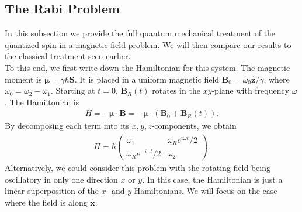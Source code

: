 \documentclass{book}
\theoremstyle{definition}
\begin{document}
\subsection{The Rabi Problem}


In this subsection we provide the full quantum mechanical treatment of the quantized spin in a magnetic field problem. We will then compare our results to the classical treatment seen earlier. \\


To this end, we first write down the Hamiltonian for this system. The magnetic moment is $\bm{\mu} = \gamma \hbar \bm{S}$. It is placed in a uniform magnetic field $\bm{B}_0 = \omega_0 \hat{\bm{z}} /\gamma$, where $\omega_0 = \omega_2 - \omega_1$. Starting at $t=0$, $\bm{B}_R(t)$ rotates in the $xy$-plane with frequency $\omega$. The Hamiltonian is 
\begin{align*}
	H = -\bm{\mu}\cdot \bm{B} = -\bm{\mu}\cdot (\bm{B}_0 + \bm{B}_R(t)).
\end{align*}
By decomposing each term into its $x,y,z$-components, we obtain 
\begin{align*}
	H = \hbar
	\begin{pmatrix}
		\omega_1 & \omega_R e^{i\omega t}/2 \\
		\omega_R e^{-i\omega t}/2 & \omega_2 
	\end{pmatrix}.
\end{align*}
Alternatively, we could consider this problem with the rotating field being oscillatory in only one direction $x$ or $y$. In this case, the Hamiltonian is just a linear superposition of the $x$- and $y$-Hamiltonians. We will focus on the case where the field is along $\hat{\bm{x}}$. \\
\end{document}
